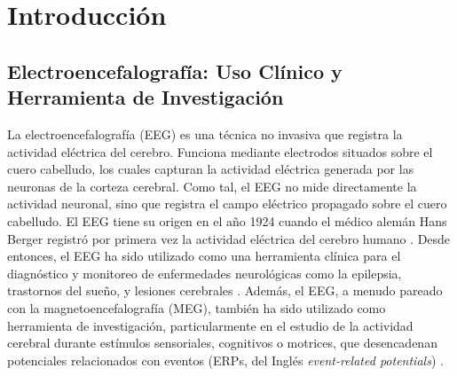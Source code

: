 %
\chapter{Introducción}
\label{sec:intro}




\section{Electroencefalografía: Uso Clínico y Herramienta de Investigación}
\label{sec:intro:eeg}

La electroencefalografía (EEG) es una técnica no invasiva que registra la actividad eléctrica del cerebro.
Funciona mediante electrodos situados sobre el cuero cabelludo, los cuales capturan la actividad eléctrica generada por las neuronas de la corteza cerebral.
Como tal, el EEG no mide directamente la actividad neuronal, sino que registra el campo eléctrico propagado sobre el cuero cabelludo.
El EEG tiene su origen en el año 1924 cuando el médico alemán Hans Berger registró por primera vez la actividad eléctrica del cerebro humano \cite{bergerUeberElektrenkephalogrammMenschen1929}.
Desde entonces, el EEG ha sido utilizado como una herramienta clínica para el diagnóstico y monitoreo de enfermedades neurológicas como la epilepsia, trastornos del sueño, y lesiones cerebrales \cite{niedermeyerElectroencephalographyBasicPrinciples2005}.
Además, el EEG, a menudo pareado con la magnetoencefalografía (MEG), también ha sido utilizado como herramienta de investigación, particularmente en el estudio de la actividad cerebral durante estímulos sensoriales, cognitivos o motrices, que desencadenan potenciales relacionados con eventos (ERPs, del Inglés \emph{event-related potentials}) \cite{luckIntroductionEventrelatedPotential2014}.

